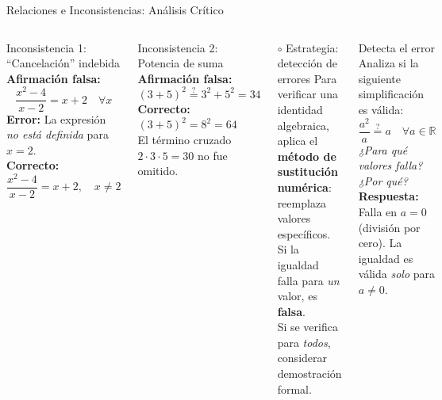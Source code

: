 \documentclass[12pt, aspectratio=169]{beamer}
\begin{document}
\begin{frame}{Relaciones e Inconsistencias: Análisis Crítico}
  \begin{columns}[T]
    \begin{alerta_box}{Inconsistencia 1: ``Cancelación'' indebida}
      \small
      \textbf{Afirmación falsa:}
      \[
        \frac{x^2 - 4}{x-2} = x+2 \quad \forall x
      \]
      \textbf{Error:} La expresión \emph{no está definida} para $x=2$.\\[4pt]
      \textbf{Correcto:}
      \[
        \frac{x^2-4}{x-2} = x+2, \quad x \neq 2
      \]
    \end{alerta_box}
    \vspace{6pt}
    \begin{alerta_box}{Inconsistencia 2: Potencia de suma}
      \small
      \textbf{Afirmación falsa:}
      \[
        (3+5)^2 \stackrel{?}{=} 3^2 + 5^2 = 34
      \]
      \textbf{Correcto:} $(3+5)^2 = 8^2 = 64$\\
      El término cruzado $2\cdot3\cdot5=30$ no fue omitido.
    \end{alerta_box}

    \begin{block}{$\circ$\; Estrategia: detección de errores}
      \small
      Para verificar una identidad algebraica, aplica el \textbf{método de sustitución numérica}: reemplaza valores específicos.\\[6pt]
      Si la igualdad falla para \emph{un} valor, es \textbf{falsa}.\\
      Si se verifica para \emph{todos}, considerar demostración formal.
    \end{block}
    \vspace{6pt}
    \begin{ejercicio}{Detecta el error}
      \small Analiza si la siguiente simplificación es válida:
      \[
        \frac{a^2}{a} \stackrel{?}{=} a \quad \forall a \in \mathbb{R}
      \]
      \textit{¿Para qué valores falla? ¿Por qué?}\\[4pt]
      \textbf{Respuesta:} Falla en $a = 0$ (división por cero). La igualdad es válida \emph{solo} para $a \neq 0$.
    \end{ejercicio}
  \end{columns}
\end{frame}
\end{document}
